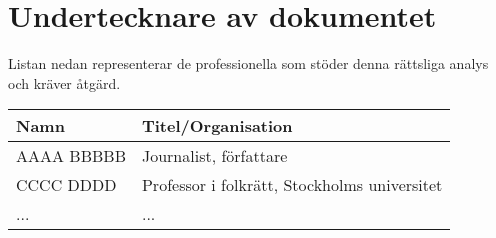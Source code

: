 \section*{Undertecknare av dokumentet}
Listan nedan representerar de professionella som stöder denna rättsliga analys och kräver åtgärd.

\vspace{1cm}
\begin{tabular}{@{}p{}p{}@{}}
\textbf{Namn} & \textbf{Titel/Organisation} \\ \midrule
AAAA BBBBB & Journalist, författare \\
CCCC DDDD & Professor i folkrätt, Stockholms universitet \\
... & ... \\
\end{tabular}

\vfill


